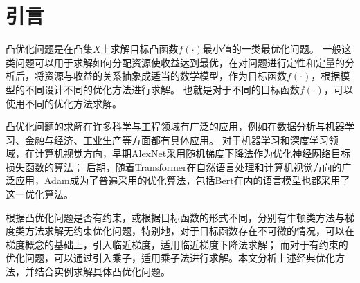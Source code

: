\section{引言}
凸优化问题是在凸集$X$上求解目标凸函数$f(\cdot)$最小值的一类最优化问题。
一般这类问题可以用于求解如何分配资源使收益达到最优，在对问题进行定性和定量的分析后，将资源与收益的关系抽象成适当的数学模型，作为目标函数$f(\cdot)$，根据模型的不同设计不同的优化方法进行求解。
也就是对于不同的目标函数$f(\cdot)$，可以使用不同的优化方法求解。

凸优化问题的求解在许多科学与工程领域有广泛的应用，例如在数据分析与机器学习、金融与经济、工业生产等方面都有具体应用。
对于机器学习和深度学习领域，在计算机视觉方向，早期AlexNet\cite{2012AlexNet}采用随机梯度下降法作为优化神经网络目标损失函数的算法；
后期，随着Transformer\cite{2017Transformer}在自然语言处理和计算机视觉方向的广泛应用，Adam\cite{2014Adam}成为了普遍采用的优化算法，包括Bert\cite{2018Bert}在内的语言模型也都采用了这一优化算法。

根据凸优化问题是否有约束，或根据目标函数的形式不同，分别有牛顿类方法与梯度类方法求解无约束优化问题，特别地，对于目标函数存在不可微的情况，可以在梯度概念的基础上，引入临近梯度，适用临近梯度下降法求解；
而对于有约束的优化问题，可以通过引入乘子，适用乘子法进行求解。本文分析上述经典优化方法，并结合实例求解具体凸优化问题。